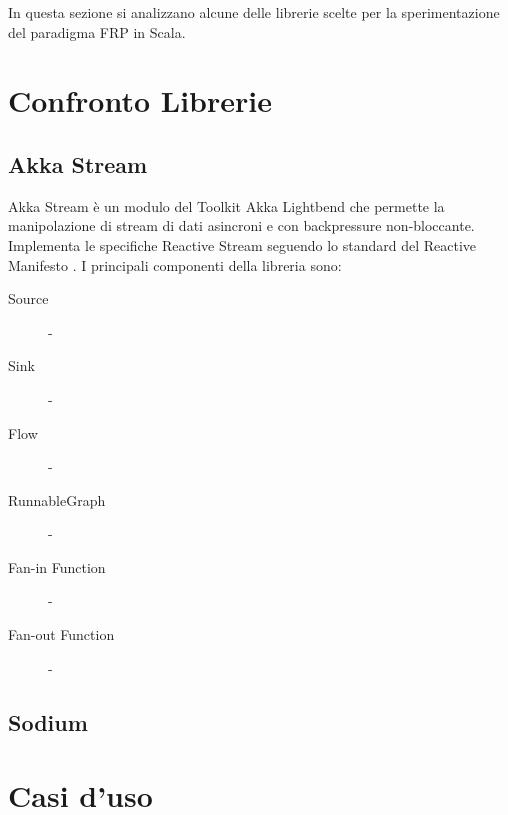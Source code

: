 \documentclass[../main.tex]{subfiles}
\begin{document}
In questa sezione si analizzano alcune delle librerie scelte per la sperimentazione del paradigma FRP in Scala.
\section{Confronto Librerie}
\subsection{Akka Stream}
Akka Stream è un modulo del Toolkit Akka Lightbend che permette la manipolazione di stream di dati asincroni e con backpressure non-bloccante. Implementa le specifiche Reactive Stream \cite{frp4} seguendo lo standard del Reactive Manifesto \cite{frp3}. I principali componenti della libreria sono:
\begin{description}
  \item[Source] -
  \item[Sink] - 
  \item[Flow] - 
  \item[RunnableGraph] - 
  \item[Fan-in Function] -
  \item[Fan-out Function] -
\end{description}
\subsection{Sodium}
\section{Casi d'uso}
\end{document}
